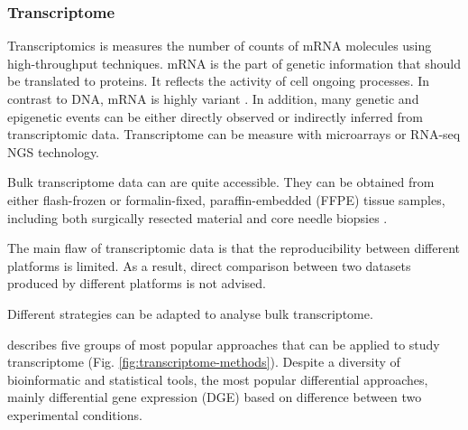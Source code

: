 \documentclass[12pt,]{book}
\theoremstyle{definition}
\theoremstyle{definition}
\theoremstyle{definition}
\theoremstyle{remark}
\begin{document}
\hypertarget{transcriptome}{%
\subsubsection{Transcriptome}\label{transcriptome}}

Transcriptomics is measures the number of counts of mRNA molecules using
high-throughput techniques. mRNA is the part of genetic information that
should be translated to proteins. It reflects the activity of cell
ongoing processes. In contrast to DNA, mRNA is highly variant
\citep{Velculescu1997}. In addition, many genetic and epigenetic events
can be either directly observed or indirectly inferred from
transcriptomic data. Transcriptome can be measure with microarrays or
RNA-seq NGS technology.

Bulk transcriptome data can are quite accessible. They can be obtained
from either flash-frozen or formalin-fixed, paraffin-embedded (FFPE)
tissue samples, including both surgically resected material and core
needle biopsies \citep{Schelker2017}.

The main flaw of transcriptomic data is that the reproducibility between
different platforms is limited. As a result, direct comparison between
two datasets produced by different platforms is not advised.

Different strategies can be adapted to analyse bulk transcriptome.

\citet{Cieslik2017} describes five groups of most popular approaches
that can be applied to study transcriptome (Fig.
\ref{fig:transcriptome-methods}). Despite a diversity of bioinformatic
and statistical tools, the most popular differential approaches, mainly
differential gene expression (DGE) based on difference between two
experimental conditions.
\end{document}
